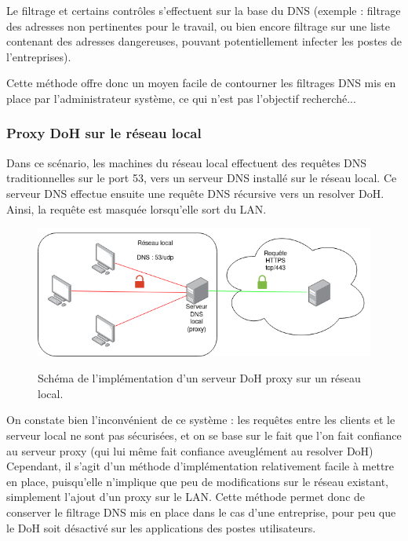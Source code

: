 \documentclass[a4paper,12pt]{article}
\begin{document}
	Le filtrage et certains contrôles s'effectuent sur la base du DNS (exemple : filtrage des adresses non pertinentes pour le travail, ou bien encore filtrage sur une liste contenant des adresses dangereuses, pouvant potentiellement infecter les postes de l'entreprises). 
	
	Cette méthode offre donc un moyen facile de contourner les filtrages DNS mis en place par l'administrateur système, ce qui n'est pas l'objectif recherché...
	
	\subsubsection{Proxy DoH sur le réseau local}
	
	Dans ce scénario, les machines du réseau local effectuent des requêtes DNS traditionnelles sur le port 53, vers un serveur DNS installé sur le réseau local. Ce serveur DNS effectue ensuite une requête DNS récursive vers un resolver DoH. Ainsi, la requête est masquée lorsqu'elle sort du LAN.
	
	\begin{figure}[H]
		\begin{center}
			{\includegraphics[scale=0.6]{Images/schema_doh_proxy_lan.png}}
		\end{center}
		\caption{Schéma de l'implémentation d'un serveur DoH proxy sur un réseau local.}
	\end{figure}
	
	On constate bien l'inconvénient de ce système : les requêtes entre les clients et le serveur local ne sont pas sécurisées, et on se base sur le fait que l'on fait confiance au serveur proxy (qui lui même fait confiance aveuglément au resolver DoH)
	Cependant, il s'agit d'un méthode d'implémentation relativement facile à mettre en place, puisqu'elle n'implique que peu de modifications sur le réseau existant, simplement l'ajout d'un proxy sur le LAN.
	Cette méthode permet donc de conserver le filtrage DNS mis en place dans le cas d'une entreprise, pour peu que le DoH soit désactivé sur les applications des postes utilisateurs.
	
\end{document}
